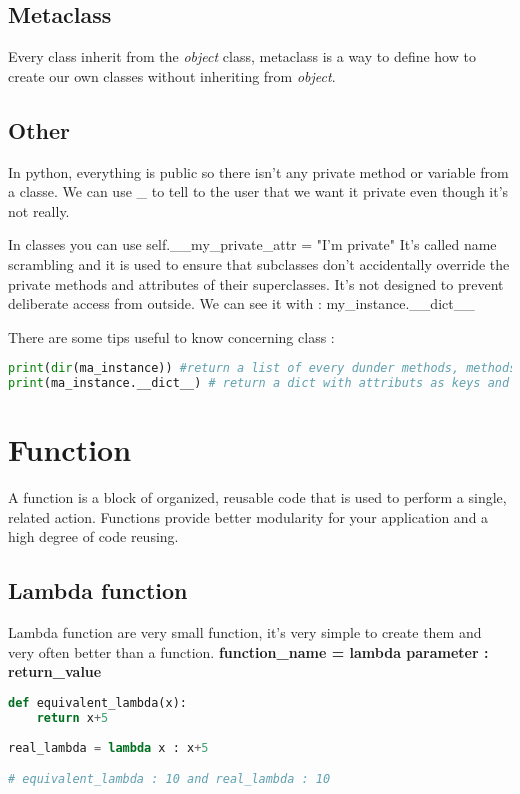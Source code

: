 \documentclass[a4paper, 12pt]{article}
\begin{document}
\subsection{Metaclass}
Every class inherit from the \textit{object} class, metaclass is a way to define how to create our own classes without inheriting from \textit{object}.

\subsection{Other}
In python, everything is public so there isn't any private method or variable from a classe. We can use \_ to tell to the user that we want it private even though it's not really.

In classes you can use self.\_\_my\_private\_attr = "I'm private" 
It's called name scrambling and it is used to ensure that subclasses don't accidentally override the private methods and attributes of their superclasses. It's not designed to prevent deliberate access from outside. We can see it with : my\_instance.\_\_dict\_\_

There are some tips useful to know concerning class :
\begin{lstlisting}[language=Python]
print(dir(ma_instance)) #return a list of every dunder methods, methods and attributs from the class.
print(ma_instance.__dict__) # return a dict with attributs as keys and their value associated.
\end{lstlisting}

\newpage
\section{Function}
\label{sec:Function}
A function is a block of organized, reusable code that is used to perform a single, related action. Functions provide better modularity for your application and a high degree of code reusing.\newline

\subsection{Lambda function}
\label{subsec:Lambda}
Lambda function are very small function, it's very simple to create them and very often better than a function. \textbf{function\_name = lambda parameter : return\_value}
\begin{lstlisting}[language=Python]
def equivalent_lambda(x):
	return x+5
	
real_lambda = lambda x : x+5

# equivalent_lambda : 10 and real_lambda : 10
\end{lstlisting}
\end{document}
